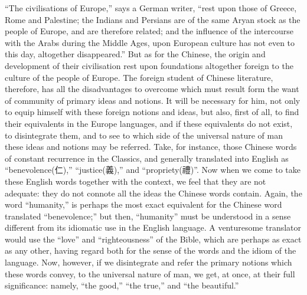 ``The civilisations of Europe,'' says a German writer,
``rest upon those of Greece, Rome and Palestine;
the Indians and Persians are of the same Aryan stock as the people of Europe,
and are therefore related; and the influence of the intercourse with the Arabs during the Middle Ages,
upon European culture has not even to this day, altogether disappeared.''
But as for the Chinese, the origin and development of their civilisation rest upon foundations altogether foreign to the culture of the people of Europe.
The foreign student of Chinese literature, therefore,
has all the disadvantages to overcome which must result form the want of community of primary ideas and notions.
It will be necessary for him,
not only to equip himself with these foreign notions and ideas,
but also, first of all, to find their equivalents in the Europe languages,
and if these equivalents do not exist, to disintegrate them,
and to see to which side of the universal nature of man these ideas and notions may be referred.
Take, for instance, those Chinese words of constant recurrence in the Classics, and generally translated into English as
``benevolence(仁),'' ``justice(義),'' and ``propriety(禮)''.
Now when we come to take these English words together with the context,
we feel that they are not adequate: they do not connote all the ideas the Chinese words contain.
Again, the word ``humanity,'' is perhaps the most exact equivalent for the Chinese word translated ``benevolence;''
but then, ``humanity'' must be understood in a sense different from its idiomatic use in the English language.
A venturesome translator would use the ``love'' and ``righteousness'' of the Bible,
which are perhaps as exact as any other,
having regard both for the sense of the words and the idiom of the language.
Now, however,
if we disintegrate and refer the primary notions which these words convey,
to the universal nature of man, we get, at once, at their full significance:
namely, ``the good,'' ``the true,'' and ``the beautiful.''

